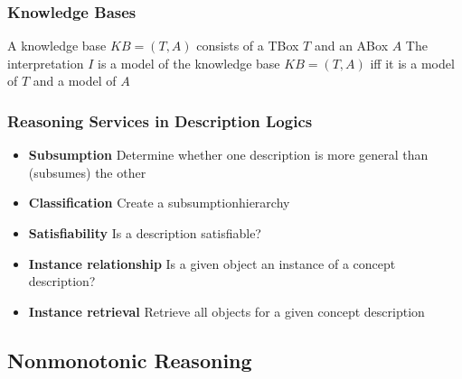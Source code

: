 \documentclass[conference, a4paper]{styles/acmsiggraph}
\begin{document}
        \subsubsection{Knowledge Bases}
            A knowledge base $KB = (T,A)$ consists of a TBox $T$ and an ABox $A$\newline
            The interpretation $I$ is a model of the knowledge base $KB = (T,A)$ iff it is a model of $T$ and a model of $A$
            
        \subsubsection{Reasoning Services in Description Logics}
            \begin{itemize}
                \item \textbf{Subsumption}\newline
                    Determine whether one description is more general than (subsumes) the other
                \item \textbf{Classification}\newline
                    Create a subsumptionhierarchy
                \item \textbf{Satisfiability}\newline
                    Is a description satisfiable?
                \item \textbf{Instance relationship}\newline
                    Is a given object an instance of a concept description?
                \item \textbf{Instance retrieval}\newline
                    Retrieve all objects for a given concept description
            \end{itemize}
        
    
    
    
    
    
    
    
    \subsection{Nonmonotonic Reasoning}
\end{document}
